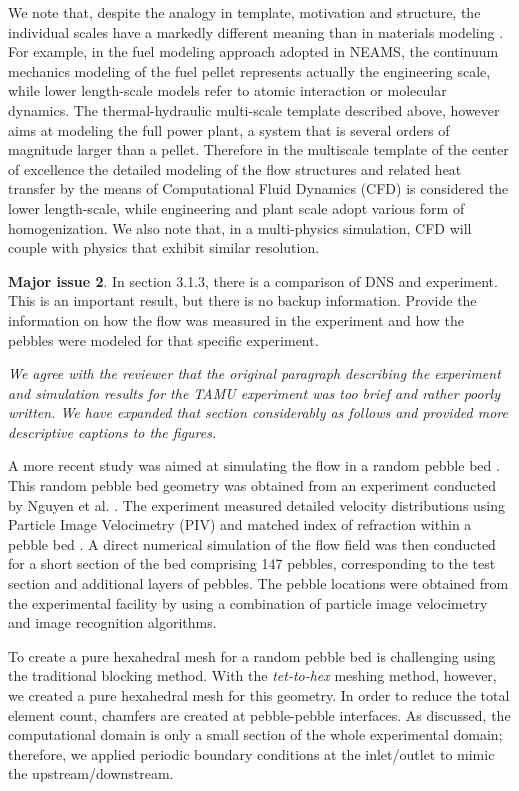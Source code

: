 \documentclass{nseJournal}
\begin{document}
We note that, despite the analogy in template, motivation and structure,  the individual scales have a markedly different meaning than in materials modeling \cite{tonks2013multiscale}. For example, in the fuel modeling approach adopted in NEAMS, the continuum mechanics modeling of the fuel pellet represents actually the engineering scale, while lower length-scale models refer to atomic interaction or molecular dynamics.
The thermal-hydraulic multi-scale template described above, however aims at modeling the full power plant, a system that is several orders of magnitude larger than a pellet.  Therefore in the multiscale template of the center of excellence the detailed modeling of the flow structures and related heat transfer  by the means of Computational Fluid Dynamics (CFD) is considered the lower length-scale, while engineering and plant scale adopt various form of homogenization. We also note that, in a multi-physics simulation, CFD will couple with physics that exhibit similar resolution.

\textbf{Major issue 2}.  In section 3.1.3, there is a comparison of DNS and experiment. This is an important result, but there is no backup information. Provide the information on how the flow was measured in the experiment and how the pebbles were modeled for that specific experiment.

\textit{We agree with the reviewer that the original paragraph describing the experiment and simulation results for the TAMU experiment was too brief and rather poorly written. We have expanded that section considerably as follows and provided more descriptive captions to the figures.}

A more recent study was aimed at simulating the flow in a random pebble bed \cite{yildiz2020direct}. This random pebble bed geometry was obtained from an experiment conducted by Nguyen et al. \cite{nguyen2018time}.  The experiment measured detailed velocity distributions using Particle Image Velocimetry (PIV) and matched index of refraction within a pebble bed . A direct numerical simulation of the flow field was then conducted for a short section of the bed comprising 147 pebbles, corresponding to the test section and additional layers of pebbles. The pebble locations were obtained from the experimental facility by using a combination of particle image velocimetry and image recognition algorithms.

To create a pure hexahedral mesh for a random pebble bed is challenging using the traditional blocking method. With the \textit{tet-to-hex} meshing method, however, we created a pure hexahedral mesh for this geometry. In order to reduce the total element count, chamfers are created at pebble-pebble interfaces. As discussed, the computational domain is only a small section of the whole experimental domain; therefore, we applied periodic boundary conditions at the inlet/outlet to mimic the upstream/downstream.
\end{document}
